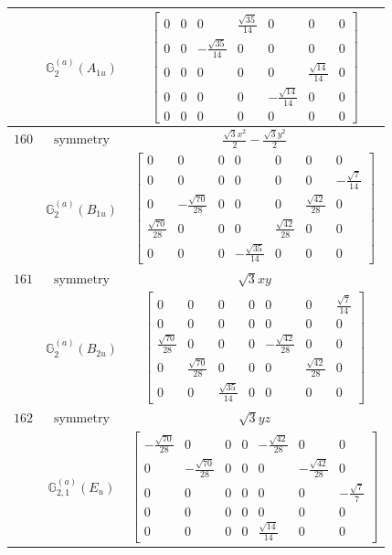 \documentclass[fleqn,8pt,landscape]{jsarticle}
\begin{document}
\begin{longtable}{ccc}
$  $ & $ \mathbb{G}_{2}^{(a)}(A_{1u}) $ & $ \begin{bmatrix} 0 & 0 & 0 & \frac{\sqrt{35}}{14} & 0 & 0 & 0 \\ 0 & 0 & - \frac{\sqrt{35}}{14} & 0 & 0 & 0 & 0 \\ 0 & 0 & 0 & 0 & 0 & \frac{\sqrt{14}}{14} & 0 \\ 0 & 0 & 0 & 0 & - \frac{\sqrt{14}}{14} & 0 & 0 \\ 0 & 0 & 0 & 0 & 0 & 0 & 0 \end{bmatrix} $ \\ \hline
$ 160 $ & $ \text{symmetry} $ & $ \frac{\sqrt{3} x^{2}}{2} - \frac{\sqrt{3} y^{2}}{2} $ \\
$  $ & $ \mathbb{G}_{2}^{(a)}(B_{1u}) $ & $ \begin{bmatrix} 0 & 0 & 0 & 0 & 0 & 0 & 0 \\ 0 & 0 & 0 & 0 & 0 & 0 & - \frac{\sqrt{7}}{14} \\ 0 & - \frac{\sqrt{70}}{28} & 0 & 0 & 0 & \frac{\sqrt{42}}{28} & 0 \\ \frac{\sqrt{70}}{28} & 0 & 0 & 0 & \frac{\sqrt{42}}{28} & 0 & 0 \\ 0 & 0 & 0 & - \frac{\sqrt{35}}{14} & 0 & 0 & 0 \end{bmatrix} $ \\ \hline
$ 161 $ & $ \text{symmetry} $ & $ \sqrt{3} x y $ \\
$  $ & $ \mathbb{G}_{2}^{(a)}(B_{2u}) $ & $ \begin{bmatrix} 0 & 0 & 0 & 0 & 0 & 0 & \frac{\sqrt{7}}{14} \\ 0 & 0 & 0 & 0 & 0 & 0 & 0 \\ \frac{\sqrt{70}}{28} & 0 & 0 & 0 & - \frac{\sqrt{42}}{28} & 0 & 0 \\ 0 & \frac{\sqrt{70}}{28} & 0 & 0 & 0 & \frac{\sqrt{42}}{28} & 0 \\ 0 & 0 & \frac{\sqrt{35}}{14} & 0 & 0 & 0 & 0 \end{bmatrix} $ \\ \hline
$ 162 $ & $ \text{symmetry} $ & $ \sqrt{3} y z $ \\
$  $ & $ \mathbb{G}_{2,1}^{(a)}(E_{u}) $ & $ \begin{bmatrix} - \frac{\sqrt{70}}{28} & 0 & 0 & 0 & - \frac{\sqrt{42}}{28} & 0 & 0 \\ 0 & - \frac{\sqrt{70}}{28} & 0 & 0 & 0 & - \frac{\sqrt{42}}{28} & 0 \\ 0 & 0 & 0 & 0 & 0 & 0 & - \frac{\sqrt{7}}{7} \\ 0 & 0 & 0 & 0 & 0 & 0 & 0 \\ 0 & 0 & 0 & 0 & \frac{\sqrt{14}}{14} & 0 & 0 \end{bmatrix} $ \\ \hline

\end{longtable}
\end{document}
